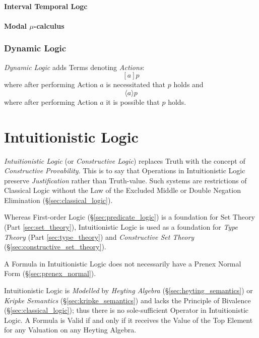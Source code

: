\paragraph{Interval Temporal Logc}

\paragraph{Modal $\mu$-calculus}



\subsubsection{Dynamic Logic}

\emph{Dynamic Logic} adds Terms denoting \emph{Actions}:
\[[a]p\]
where after performing Action $a$ is necessitated that $p$ holds and
\[\langle a \rangle p\]
where after performing Action $a$ it is possible that $p$ holds.



\section{Intuitionistic Logic}\label{sec:intuitionistic_logic}

\emph{Intuitionistic Logic} (or \emph{Constructive Logic}) replaces
Truth with the concept of \emph{Constructive Provability}. This is to
say that Operations in Intuitionistic Logic preserve
\emph{Justification} rather than Truth-value. Such systems are
restrictions of Classical Logic without the Law of the Excluded Middle
or Double Negation Elimination (\S\ref{sec:classical_logic}).

Whereas First-order Logic (\S\ref{sec:predicate_logic}) is a
foundation for Set Theory (Part \ref{sec:set_theory}), Intuitionistic
Logic is used as a foundation for \emph{Type Theory} (Part
\ref{sec:type_theory}) and \emph{Constructive Set Theory}
(\S\ref{sec:constructive_set_theory}).

A Formula in Intuitionistic Logic does not necessarily have a Prenex
Normal Form (\S\ref{sec:prenex_normal}).

Intuitionistic Logic is \emph{Modelled} by \emph{Heyting Algebra}
(\S\ref{sec:heyting_semantics}) or \emph{Kripke Semantics}
(\S\ref{sec:kripke_semantics}) and lacks the Principle of Bivalence
(\S\ref{sec:classical_logic}); thus there is no sole-sufficient
Operator in Intuitionistic Logic. A Formula is Valid if and only if it
receives the Value of the Top Element for any Valuation on any Heyting
Algebra.

